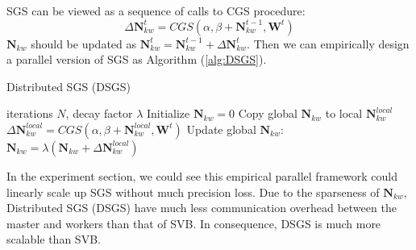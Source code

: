 \documentclass{article} %
\begin{document}
SGS can be viewed as a sequence of calls to CGS procedure: 
$$\Delta \bm{N}_{kw}^t=CGS(\alpha, \beta +\bm{N}_{kw}^{t-1}, \bm{W}^t)$$
$\bm{N}_{kw}$ should be updated as $\bm{N}_{kw}^t=\bm{N}_{kw}^{t-1}+\Delta \bm{N}_{kw}^t$. Then we can empirically design a parallel version of SGS as Algorithm (\ref{alg:DSGS}).

\begin{algorithm}[tb]
   \caption{Distributed SGS (DSGS)}
   \label{alg:DSGS}
\begin{algorithmic}
    iterations $N$, decay factor $\lambda$
   \STATE Initialize $\bm{N}_{kw}=0$
   		\STATE Copy global $\bm{N}_{kw}$ to local $\bm{N}_{kw}^{local}$
   		\STATE $\Delta \bm{N}_{kw}^{local}=CGS(\alpha, \beta+\bm{N}_{kw}^{local}, \bm{W}^t)$
   		\STATE Update global $\bm{N}_{kw}$: $\bm{N}_{kw}=\lambda (\bm{N}_{kw} + \Delta \bm{N}_{kw}^{local})$
   \ENDFOR   
\end{algorithmic}
\end{algorithm}

In the experiment section, we could see this empirical parallel framework could linearly scale up SGS without much precision loss. Due to the sparseness of $\bm{N}_{kw}$, Distributed SGS (DSGS) have much less communication overhead between the master and workers than that of SVB. In consequence, DSGS is much more scalable than SVB. 

\end{document}
